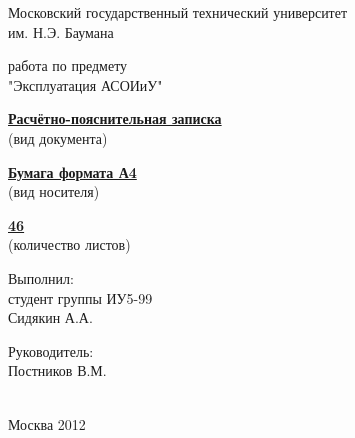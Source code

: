 \thispagestyle{empty}

\begin{center}
Московский государственный технический университет \\ им. Н.Э. Баумана \\
\hrulefill
\end{center}

\vspace{8em}

\begin{center}
 работа по предмету \\ "Эксплуатация АСОИиУ"
\end{center}

\vspace{2em}
\thispagestyle{empty}

\begin{center}
\underline{\textbf{Расчётно-пояснительная записка}} \\ (вид документа)
\end{center}

\begin{center}
\underline{\textbf{Бумага формата А4}} \\ (вид носителя)
\end{center}

\begin{center}
\underline{\textbf{46}} \\ (количество листов) %
\end{center}

\vspace{2em}

\begin{flushright}
Выполнил: \\ студент группы ИУ5-99 \\ Сидякин А.А. \par\bigskip

Руководитель: \\ Постников В.М.
\end{flushright}

\vspace{\fill}

\begin{center}
\hrulefill \\
Москва 2012
\end{center}